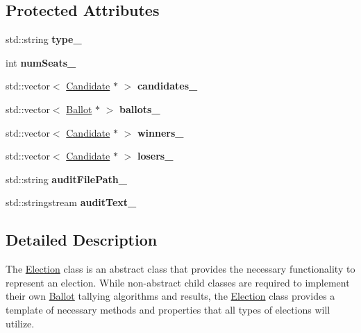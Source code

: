 \subsection*{Protected Attributes}
\begin{DoxyCompactItemize}
\item 
\mbox{\label{classElection_a50e140cb8138c91be243bec30a78125e}} 
std\+::string {\bfseries type\+\_\+}
\item 
\mbox{\label{classElection_a9c116f9c551c84348c026ab9a05ab0f4}} 
int {\bfseries num\+Seats\+\_\+}
\item 
\mbox{\label{classElection_aebd1b5662e37beaac28acae18fda15f6}} 
std\+::vector$<$ \hyperlink{classCandidate}{Candidate} $\ast$ $>$ {\bfseries candidates\+\_\+}
\item 
\mbox{\label{classElection_a309d7e1f884da5b37c9c582f8ffc559c}} 
std\+::vector$<$ \hyperlink{classBallot}{Ballot} $\ast$ $>$ {\bfseries ballots\+\_\+}
\item 
\mbox{\label{classElection_a13d2d174fb9a3b3044f078e8560c226a}} 
std\+::vector$<$ \hyperlink{classCandidate}{Candidate} $\ast$ $>$ {\bfseries winners\+\_\+}
\item 
\mbox{\label{classElection_ac8e2a461ac014f2c45d1de8ca4d940ec}} 
std\+::vector$<$ \hyperlink{classCandidate}{Candidate} $\ast$ $>$ {\bfseries losers\+\_\+}
\item 
\mbox{\label{classElection_ad564bb183a5a0679398d0a74c213a92a}} 
std\+::string {\bfseries audit\+File\+Path\+\_\+}
\item 
\mbox{\label{classElection_a5dcc64f43ede2f4878fbe15db51b2c4c}} 
std\+::stringstream {\bfseries audit\+Text\+\_\+}
\end{DoxyCompactItemize}


\subsection{Detailed Description}
The \hyperlink{classElection}{Election} class is an abstract class that provides the necessary functionality to represent an election. While non-\/abstract child classes are required to implement their own \hyperlink{classBallot}{Ballot} tallying algorithms and results, the \hyperlink{classElection}{Election} class provides a template of necessary methods and properties that all types of elections will utilize. 

